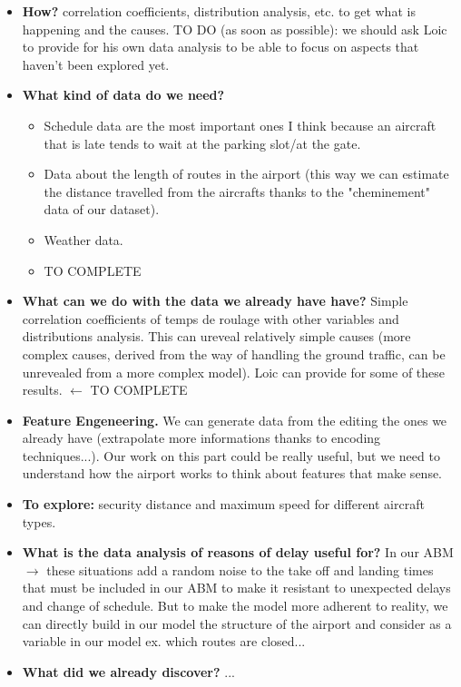 \documentclass{article}
\begin{document}
\begin{itemize}
\item \textbf{How?} correlation coefficients, distribution analysis, etc. to get what is happening and the causes. TO DO (as soon as possible): we should ask Loic to provide for his own data analysis to be able to focus on aspects that haven't been explored yet. 

\item \textbf{ What kind of data do we need? }
\begin{itemize}
\item Schedule data are the most important ones I think because an aircraft that is late tends to wait at the parking slot/at the gate.

\item Data about the length of routes in the airport (this way we can estimate the distance travelled from the aircrafts thanks to the "cheminement" data of our dataset). 
	
\item Weather data.

\item TO COMPLETE
\end{itemize}
	

\item \textbf{What can we do with the data we already have have?}
	Simple correlation coefficients of temps de roulage with other variables and distributions analysis. This can ureveal relatively simple causes (more complex causes, derived from the way of handling the ground traffic, can be unrevealed from a more complex model). Loic can provide for some of these results. $\leftarrow$ TO COMPLETE

\item \textbf{Feature Engeneering.} We can generate data from the editing the ones we already have (extrapolate more informations thanks to encoding techniques...). Our work on this part could be really useful, but we need to understand how the airport works to think about features that make sense.
	
\item \textbf{To explore:} security distance and maximum speed for different aircraft types.

\item \textbf{What is the data analysis of reasons of delay useful for?} In our ABM $\rightarrow$ these situations add a random noise to the take off and landing times that must be included in our ABM to make it resistant to unexpected delays and change of schedule. But to make the model more adherent to reality, we can directly build in our model the structure of the airport and consider as a variable in our model ex. which routes are closed...

\item \textbf{What did we already discover?} ...
\end{itemize}
\end{document}
